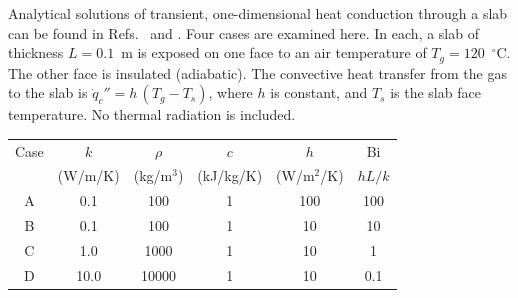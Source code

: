 \documentclass[11pt]{book}
\newcommand{\dq}{\dot{q}}
\begin{document}
Analytical solutions of transient, one-dimensional heat conduction through a
slab can be found in Refs.~\cite{Drysdale:1} and
\cite{Carslaw:1}. Four cases are examined here. In each, a slab of
thickness $L=0.1$~m is exposed on one face to an air temperature of $T_g=120$~$^\circ$C. The other face is insulated (adiabatic). The convective
heat transfer from the gas to the slab is $\dq_c'' = h \, (T_g - T_s)$,
where $h$ is constant, and $T_s$ is the slab face temperature. No thermal radiation is included.
\begin{center}
\begin{tabular}{|c|c|c|c|c|c|}
\hline
Case  &  $k$      & $\rho$       &  $c$          &   $h$         &  Bi     \\
      & (W/m/K)   & (kg/m$^3$)   &  (kJ/kg/K)    &  (W/m$^2$/K)  &  $hL/k$ \\ \hline \hline
A     &   0.1     & 100          &  1            &  100          &  100    \\ \hline
B     &   0.1     & 100          &  1            &  10           &  10     \\ \hline
C     &   1.0     & 1000         &  1            &  10           &  1      \\ \hline
D     &  10.0     & 10000        &  1            &  10           & 0.1     \\ \hline
\end{tabular}
\end{center}
\end{document}
